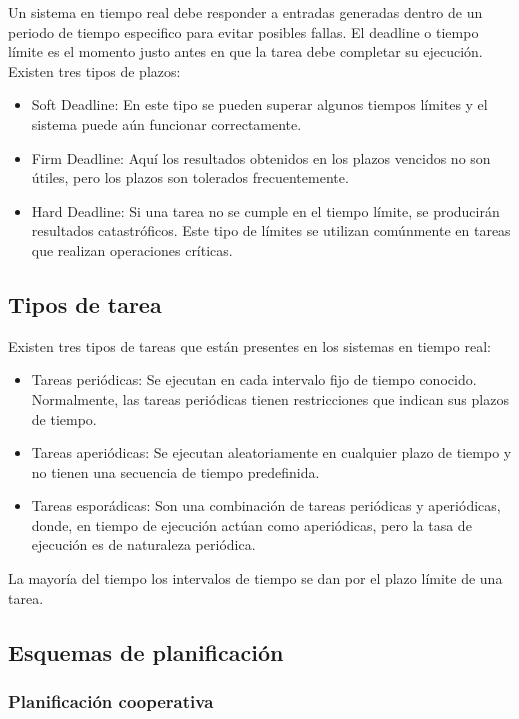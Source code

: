     Un sistema en tiempo real debe  responder a entradas generadas dentro de un periodo de tiempo especifico para evitar posibles fallas. El deadline o tiempo límite es el momento justo antes en que la tarea debe completar su ejecución. Existen tres tipos de plazos: 
\begin{itemize}
\item Soft Deadline: En este tipo se pueden superar algunos tiempos límites y el sistema puede aún funcionar correctamente.
\item Firm Deadline: Aquí los resultados obtenidos en los plazos vencidos no son útiles, pero los plazos son tolerados frecuentemente.
\item Hard Deadline: Si una tarea no se cumple en el tiempo límite, se producirán resultados catastróficos. Este tipo de límites se utilizan comúnmente en tareas que realizan operaciones críticas.
\end{itemize}   

\subsection{Tipos de tarea}

Existen tres tipos de tareas que están presentes en los sistemas en tiempo real:

\begin{itemize}
\item Tareas periódicas: Se ejecutan en cada intervalo fijo de tiempo conocido. Normalmente, las tareas periódicas tienen restricciones que indican sus plazos de tiempo.
\item Tareas aperiódicas: Se ejecutan aleatoriamente en cualquier plazo de tiempo y no tienen una secuencia de tiempo predefinida.
\item Tareas esporádicas: Son una combinación de tareas periódicas y aperiódicas, donde, en tiempo de ejecución actúan como aperiódicas, pero la tasa de ejecución es de naturaleza periódica.
\end{itemize}   

La mayoría del tiempo los intervalos de tiempo se dan por el plazo límite de una tarea.

    \subsection{Esquemas de planificación}
    
        \subsubsection{Planificación cooperativa}


